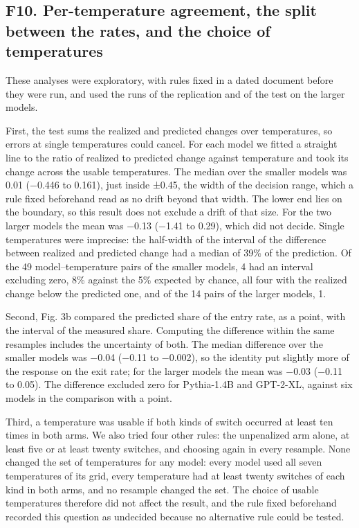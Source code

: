 \documentclass[aps,prx,onecolumn,superscriptaddress,longbibliography]{revtex4-2}
\begin{document}
\subsection*{F10. Per-temperature agreement, the split between the rates, and the choice of temperatures}

These analyses were exploratory, with rules fixed in a dated document before they were run, and used the runs of the replication and of the test on the larger models.

First, the test sums the realized and predicted changes over temperatures, so errors at single temperatures could cancel. For each model we fitted a straight line to the ratio of realized to predicted change against temperature and took its change across the usable temperatures. The median over the smaller models was 0.01 (−0.446 to 0.161), just inside ±0.45, the width of the decision range, which a rule fixed beforehand read as no drift beyond that width. The lower end lies on the boundary, so this result does not exclude a drift of that size. For the two larger models the mean was −0.13 (−1.41 to 0.29), which did not decide. Single temperatures were imprecise: the half-width of the interval of the difference between realized and predicted change had a median of 39\% of the prediction. Of the 49 model--temperature pairs of the smaller models, 4 had an interval excluding zero, 8\% against the 5\% expected by chance, all four with the realized change below the predicted one, and of the 14 pairs of the larger models, 1.

Second, Fig. 3b compared the predicted share of the entry rate, as a point, with the interval of the measured share. Computing the difference within the same resamples includes the uncertainty of both. The median difference over the smaller models was −0.04 (−0.11 to −0.002), so the identity put slightly more of the response on the exit rate; for the larger models the mean was −0.03 (−0.11 to 0.05). The difference excluded zero for Pythia-1.4B and GPT-2-XL, against six models in the comparison with a point.

Third, a temperature was usable if both kinds of switch occurred at least ten times in both arms. We also tried four other rules: the unpenalized arm alone, at least five or at least twenty switches, and choosing again in every resample. None changed the set of temperatures for any model: every model used all seven temperatures of its grid, every temperature had at least twenty switches of each kind in both arms, and no resample changed the set. The choice of usable temperatures therefore did not affect the result, and the rule fixed beforehand recorded this question as undecided because no alternative rule could be tested.
\end{document}
